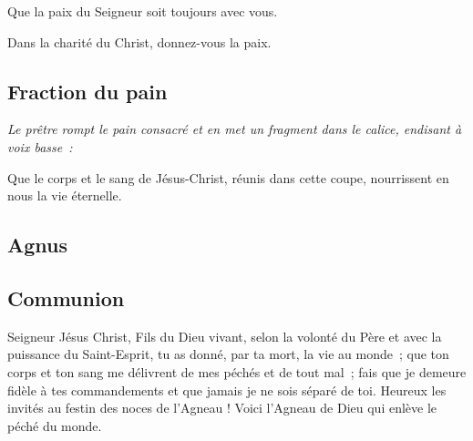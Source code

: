 
Que la paix du Seigneur soit toujours avec vous.


Dans la charité du Christ, donnez-vous la paix.

\subsection{Fraction du pain}

\emph{Le prêtre rompt le pain consacré et en met un fragment dans le            
calice, endisant à voix basse~:}

Que le corps et le sang de Jésus-Christ, réunis dans cette coupe,
nourrissent en nous la vie éternelle.

\subsection{Agnus}



\subsection{Communion}


Seigneur Jésus Christ, Fils du Dieu vivant, selon la volonté du Père
et avec la puissance du Saint-Esprit, tu as donné, par ta mort, la vie
au monde~; que ton corps et ton sang me délivrent de mes péchés et de
tout mal~; fais que je demeure fidèle à tes commandements et que
jamais je ne sois séparé de toi.
Heureux les invités au festin des noces de l'Agneau !
Voici l'Agneau de Dieu qui enlève le péché du monde.


